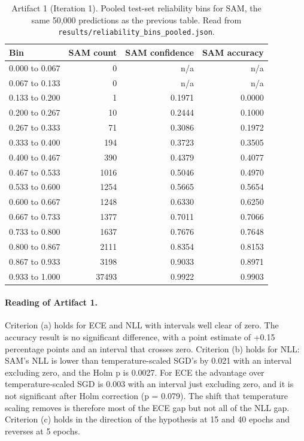 \documentclass[11pt,letterpaper]{article}
\begin{document}
\begin{table}[!htbp]
\centering
\footnotesize
\caption{Artifact 1 (Iteration 1). Pooled test-set reliability bins for SAM, the same 50,000 predictions as the previous table. Read from \texttt{results/reliability\_bins\_pooled.json}.}
\label{tab:reliabB}
\begin{tabular}{lrrr}
\toprule
Bin & SAM count & SAM confidence & SAM accuracy \\
\midrule
0.000 to 0.067 & 0 & n/a & n/a \\
0.067 to 0.133 & 0 & n/a & n/a \\
0.133 to 0.200 & 1 & 0.1971 & 0.0000 \\
0.200 to 0.267 & 10 & 0.2444 & 0.1000 \\
0.267 to 0.333 & 71 & 0.3086 & 0.1972 \\
0.333 to 0.400 & 194 & 0.3723 & 0.3505 \\
0.400 to 0.467 & 390 & 0.4379 & 0.4077 \\
0.467 to 0.533 & 1016 & 0.5046 & 0.4970 \\
0.533 to 0.600 & 1254 & 0.5665 & 0.5654 \\
0.600 to 0.667 & 1248 & 0.6330 & 0.6250 \\
0.667 to 0.733 & 1377 & 0.7011 & 0.7066 \\
0.733 to 0.800 & 1637 & 0.7676 & 0.7648 \\
0.800 to 0.867 & 2111 & 0.8354 & 0.8153 \\
0.867 to 0.933 & 3198 & 0.9033 & 0.8971 \\
0.933 to 1.000 & 37493 & 0.9922 & 0.9903 \\
\bottomrule
\end{tabular}
\end{table}

\paragraph{Reading of Artifact 1.} Criterion (a) holds for ECE and NLL with intervals well clear of zero. The accuracy result is no significant difference, with a point estimate of +0.15 percentage points and an interval that crosses zero. Criterion (b) holds for NLL: SAM's NLL is lower than temperature-scaled SGD's by 0.021 with an interval excluding zero, and the Holm p is 0.0027. For ECE the advantage over temperature-scaled SGD is 0.003 with an interval just excluding zero, and it is not significant after Holm correction (p = 0.079). The shift that temperature scaling removes is therefore most of the ECE gap but not all of the NLL gap. Criterion (c) holds in the direction of the hypothesis at 15 and 40 epochs and reverses at 5 epochs.
\end{document}
